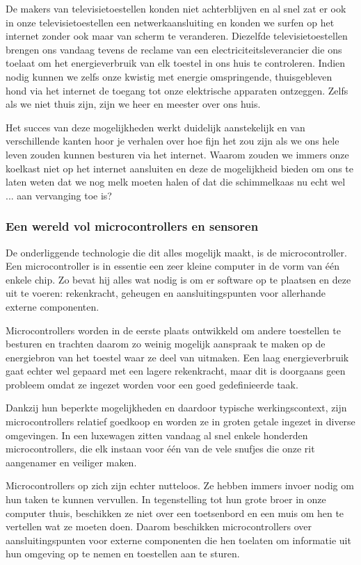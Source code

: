 \documentclass[DIV=calc,paper=a4,fontsize=11pt,twocolumn]{scrartcl}
\newcommand{\heading}[1]{
\vspace{-5mm}
\subsubsection*{#1}
\vspace{-2mm}
}
\begin{document}
De makers van televisietoestellen konden niet achterblijven en al snel zat er
ook in onze televisietoestellen een netwerkaansluiting en konden we surfen op
het internet zonder ook maar van scherm te veranderen. Diezelfde
televisietoestellen brengen ons vandaag tevens de reclame van een
electriciteitsleverancier die ons toelaat om het energieverbruik van elk
toestel in ons huis te controleren. Indien nodig kunnen we zelfs onze kwistig
met energie omspringende, thuisgebleven hond via het internet de toegang tot
onze elektrische apparaten ontzeggen. Zelfs als we niet thuis zijn, zijn we
heer en meester over ons huis.

Het succes van deze mogelijkheden werkt duidelijk aanstekelijk en van
verschillende kanten hoor je verhalen over hoe fijn het zou zijn als we ons
hele leven zouden kunnen besturen via het internet. Waarom zouden we immers
onze koelkast niet op het internet aansluiten en deze de mogelijkheid bieden om
ons te laten weten dat we nog melk moeten halen of dat die schimmelkaas nu echt
wel ... aan vervanging toe is?

\heading{Een wereld vol microcontrollers en sensoren}

De onderliggende technologie die dit alles mogelijk maakt, is de
microcontroller. Een microcontroller is in essentie een zeer kleine computer in
de vorm van \'e\'en enkele chip. Zo bevat hij alles wat nodig is om er software
op te plaatsen en deze uit te voeren: rekenkracht, geheugen en
aansluitingspunten voor allerhande externe componenten.

Microcontrollers worden in de eerste plaats ontwikkeld om andere toestellen te
besturen en trachten daarom zo weinig mogelijk aanspraak te maken op de
energiebron van het toestel waar ze deel van uitmaken. Een laag energieverbruik
gaat echter wel gepaard met een lagere rekenkracht, maar dit is doorgaans geen
probleem omdat ze ingezet worden voor een goed gedefinieerde taak.

Dankzij hun beperkte mogelijkheden en daardoor typische werkingscontext, zijn
microcontrollers relatief goedkoop en worden ze in groten getale ingezet in
diverse omgevingen. In een luxewagen zitten vandaag al snel enkele honderden
microcontrollers, die elk instaan voor \'e\'en van de vele snufjes die onze rit
aangenamer en veiliger maken.

Microcontrollers op zich zijn echter nutteloos. Ze hebben immers invoer nodig
om hun taken te kunnen vervullen. In tegenstelling tot hun grote broer in onze
computer thuis, beschikken ze niet over een toetsenbord en een muis om hen te
vertellen wat ze moeten doen. Daarom beschikken microcontrollers over
aansluitingspunten voor externe componenten die hen toelaten om informatie uit
hun omgeving op te nemen en toestellen aan te sturen.
\end{document}

